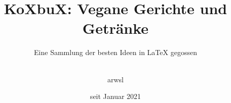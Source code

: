 \setcounter{page}{-1}
\subject{\vspace{2cm}
	\large Rezeptsammlung
	\vspace{1cm}
	}
\title{KoXbuX: Vegane Gerichte und Getränke}
\subtitle{Eine Sammlung der besten Ideen in \LaTeX\: gegossen}

\author{\vspace{4cm}\\
	arwsl\\
	\vspace{2cm}}

\date{seit Januar 2021}




\maketitle
\thispagestyle{empty}
\cleardoubleemptypage
